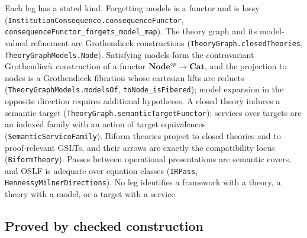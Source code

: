 \documentclass[11pt]{article}
\theoremstyle{definition}
\theoremstyle{remark}
\begin{document}
Each leg has a stated kind.  Forgetting models is a functor and is lossy
(\nolinkurl{InstitutionConsequence.consequenceFunctor},
\nolinkurl{consequenceFunctor_forgets_model_map}).  The theory graph and its
model-valued refinement are Grothendieck constructions
(\nolinkurl{TheoryGraph.closedTheories}, \nolinkurl{TheoryGraphModels.Node}).
Satisfying models form the contravariant Grothendieck construction of a
functor $\mathbf{Node}^{op}\to\mathbf{Cat}$, and the projection to nodes is
a Grothendieck fibration whose cartesian lifts are reducts
(\nolinkurl{TheoryGraphModels.modelsOf}, \texttt{toNode\_isFibered}); model
expansion in the opposite direction requires additional hypotheses.
A closed theory induces a semantic target
(\nolinkurl{TheoryGraph.semanticTargetFunctor}); services over targets are an
indexed family with an action of target equivalences
(\texttt{SemanticServiceFamily}).  Biform theories project to closed theories and
to proof-relevant GSLTs, and their arrows are exactly the compatibility
locus (\texttt{BiformTheory}).  Passes between operational presentations are
semantic covers, and OSLF is adequate over equation classes
(\texttt{IRPass}, \nolinkurl{HennessyMilnerDirections}).  No leg identifies a
framework with a theory, a theory with a model, or a target with a service.

\subsection{Proved by checked construction}
\end{document}

